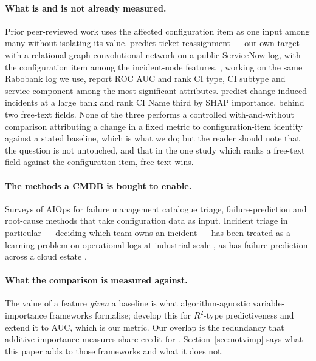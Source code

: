 \documentclass[preprint,12pt]{elsarticle}
\begin{document}
\paragraph{What is and is not already measured.}
Prior peer-reviewed work uses the affected configuration item as one input
among many without isolating its value. \citet{schad2022reassign} predict
ticket reassignment --- our own target --- with a relational graph
convolutional network on a public ServiceNow log, with the configuration
item among the incident-node features. \citet{sarnovsky2018predictive}, working
on the same Rabobank log we use, report ROC AUC and rank CI type, CI subtype
and service component among the most significant attributes.
\citet{kapel2026change} predict change-induced incidents at a large bank and
rank CI Name third by SHAP importance, behind two free-text fields. None of
the three performs a controlled with-and-without comparison attributing a
change in a fixed metric to configuration-item identity against a stated
baseline, which is what we do; but the reader should note that the
question is not untouched, and that in the one study which ranks a
free-text field against the configuration item, free text wins.

\paragraph{The methods a CMDB is bought to enable.}
Surveys of AIOps for failure management
\citep{zhang2024aiops,remil2024aiops,notaro2021aiops} catalogue triage,
failure-prediction and root-cause methods that take configuration data as
input. Incident triage in particular --- deciding which team owns an
incident --- has been treated as a learning problem on operational logs at
industrial scale \citep{chen2019triage}, as has failure prediction across a
cloud estate \citep{lin2018node}.

\paragraph{What the comparison is measured against.}
The value of a feature \emph{given} a baseline is what algorithm-agnostic
variable-importance frameworks formalise; \citet{williamson2021vimp} develop
this for $R^2$-type predictiveness and \citet{williamson2023vimp} extend it
to AUC, which is our metric. Our overlap is the redundancy that additive
importance measures share credit for \citep{covert2020sage}.
Section~\ref{sec:notvimp} says what this paper adds to those frameworks and
what it does not.
\end{document}
